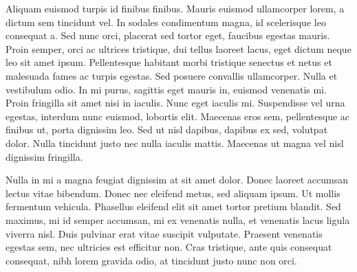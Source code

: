 Aliquam euismod turpis id finibus finibus. Mauris euismod ullamcorper lorem, a
dictum sem tincidunt vel. In sodales condimentum magna, id scelerisque leo
consequat a. Sed nunc orci, placerat sed tortor eget, faucibus egestas mauris.
Proin semper, orci ac ultrices tristique, dui tellus laoreet lacus, eget dictum
neque leo sit amet ipsum. Pellentesque habitant morbi tristique senectus et
netus et malesuada fames ac turpis egestas. Sed posuere convallis ullamcorper.
Nulla et vestibulum odio. In mi purus, sagittis eget mauris in, euismod
venenatis mi. Proin fringilla sit amet nisi in iaculis. Nunc eget iaculis mi.
Suspendisse vel urna egestas, interdum nunc euismod, lobortis elit. Maecenas
eros sem, pellentesque ac finibus ut, porta dignissim leo. Sed ut nisl dapibus,
dapibus ex sed, volutpat dolor. Nulla tincidunt justo nec nulla iaculis mattis.
Maecenas ut magna vel nisl dignissim fringilla.

Nulla in mi a magna feugiat dignissim at sit amet dolor. Donec laoreet accumsan
lectus vitae bibendum. Donec nec eleifend metus, sed aliquam ipsum. Ut mollis
fermentum vehicula. Phasellus eleifend elit sit amet tortor pretium blandit.
Sed maximus, mi id semper accumsan, mi ex venenatis nulla, et venenatis lacus
ligula viverra nisl. Duis pulvinar erat vitae suscipit vulputate. Praesent
venenatis egestas sem, nec ultricies est efficitur non. Cras tristique, ante
quis consequat consequat, nibh lorem gravida odio, at tincidunt justo nunc non
orci.
\par
